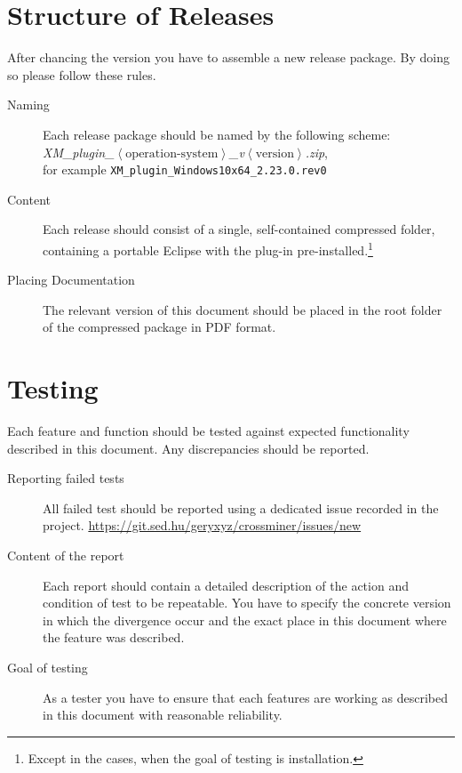 \documentclass[11pt,a4paper]{book}
\newcommand{\placeholder}[1]{$\left\langle\text{#1}\right\rangle$}
\begin{document}
\section{Structure of Releases}

After chancing the version you have to assemble a new release package. By doing so please follow these rules.

\begin{description}
	\item[Naming] Each release package should be named by the following scheme: \emph{XM\_plugin\_\placeholder{operation-system}\_v\placeholder{version}.zip},\\for example \texttt{XM\_plugin\_Windows10x64\_2.23.0.rev0}
	\item[Content] Each release should consist of a single, self-contained compressed folder, containing a portable Eclipse with the plug-in pre-installed.\footnote{Except in the cases, when the goal of testing is installation.}
	\item[Placing Documentation] The relevant version of this document should be placed in the root folder of the compressed package in PDF format.
\end{description}

\section{Testing}

Each feature and function should be tested against expected functionality described in this document. Any discrepancies should be reported.

\begin{description}
	\item[Reporting failed tests] All failed test should be reported using a dedicated issue recorded in the project. \url{https://git.sed.hu/geryxyz/crossminer/issues/new}
	\item[Content of the report] Each report should contain a detailed description of the action and condition of test to be repeatable. You have to specify the concrete version in which the divergence occur and the exact place in this document where the feature was described.
	\item[Goal of testing] As a tester you have to ensure that each features are working as described in this document with reasonable reliability.
\end{description}
\end{document}
